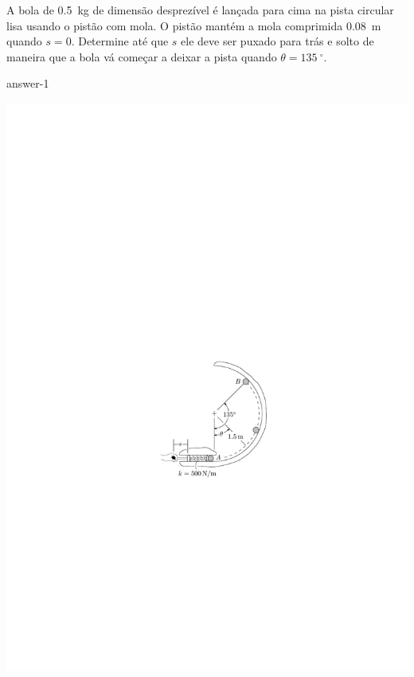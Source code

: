 
\item A bola de \SI{0.5}{\kilogram} de dimensão desprezível é lançada para cima na pista circular lisa usando o pistão com mola. O pistão mantém a mola comprimida \SI{0.08}{\meter} quando $s=0$. Determine até que $s$ ele deve ser puxado para trás e solto de maneira que a bola vá começar a deixar a pista quando $\theta=\SI{135}{^{\circ}}$.

{answer-1}

\vspace{-1.6cm}
\begin{flushright}
    \includegraphics[scale=1.2]{images/draw_1.pdf}
\end{flushright}\vspace{-.65cm}